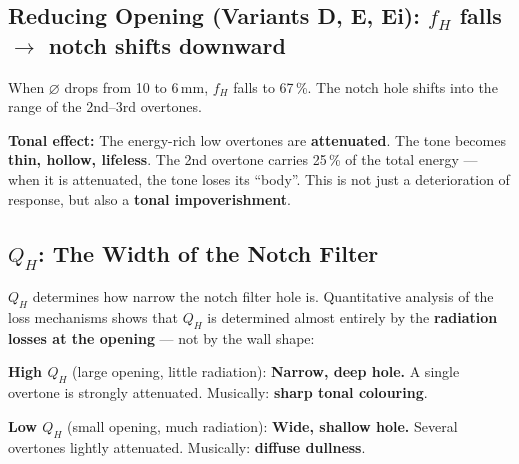 \documentclass[11pt,a4paper]{article}
\begin{document}
\subsection{Reducing Opening (Variants D, E, Ei): $f_H$ falls $\to$ notch shifts downward}

When $\varnothing$ drops from 10 to 6\,mm, $f_H$ falls to 67\,\%. The notch hole shifts into the range of the 2nd--3rd overtones.

\textbf{Tonal effect:} The energy-rich low overtones are \textbf{attenuated}. The tone becomes \textbf{thin, hollow, lifeless}. The 2nd overtone carries 25\,\% of the total energy --- when it is attenuated, the tone loses its ``body''. This is not just a deterioration of response, but also a \textbf{tonal impoverishment}.

\subsection{$Q_H$: The Width of the Notch Filter}

$Q_H$ determines how narrow the notch filter hole is. Quantitative analysis of the loss mechanisms shows that $Q_H$ is determined almost entirely by the \textbf{radiation losses at the opening} --- not by the wall shape:

\begin{table}[H]
\centering\footnotesize
{}
\caption{Decomposition of $Q_H$. Wall shape changes $Q_\text{visc}$ by $\pm 5$--$10\,\%$ (area), shifting $Q_\text{total}$ by at most $\pm 3\,\%$ (treble) to $\pm 7\,\%$ (bass) --- inaudible.}
\end{table}

\textbf{High $Q_H$} (large opening, little radiation): \textbf{Narrow, deep hole.} A single overtone is strongly attenuated. Musically: \textbf{sharp tonal colouring}.

\textbf{Low $Q_H$} (small opening, much radiation): \textbf{Wide, shallow hole.} Several overtones lightly attenuated. Musically: \textbf{diffuse dullness}.
\end{document}
